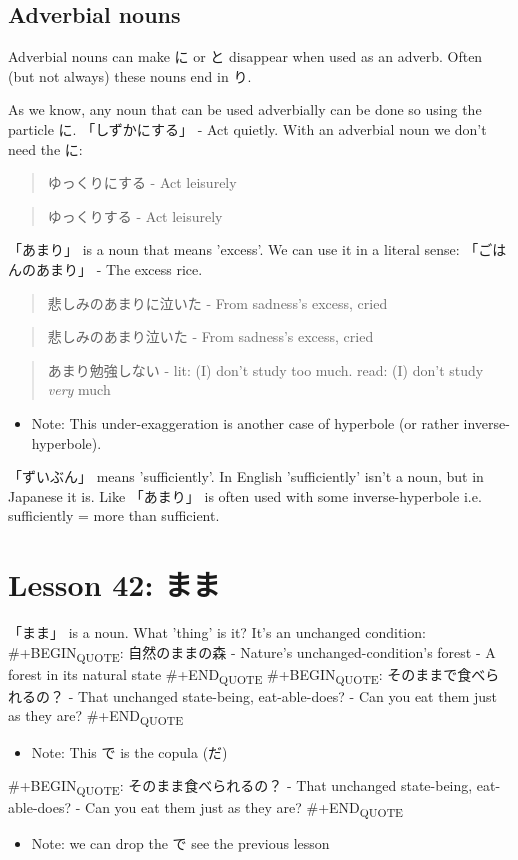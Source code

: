 \documentclass[11pt]{article}
\begin{document}
\subsection{Adverbial nouns}
\label{sec:org7eca3e8}
Adverbial nouns can make に or と disappear when used as an adverb. Often (but not always) these nouns end in り.

As we know, any noun that can be used adverbially can be done so using the particle に. 「しずかにする」 - Act quietly. With an adverbial noun we don't need the に:
\begin{quote}
ゆっくりにする - Act leisurely
\end{quote}
\begin{quote}
ゆっくりする - Act leisurely
\end{quote}

「あまり」 is a noun that means 'excess'. We can use it in a literal sense: 「ごはんのあまり」 - The excess rice.
\begin{quote}
悲しみのあまりに泣いた - From sadness's excess, cried
\end{quote}
\begin{quote}
悲しみのあまり泣いた - From sadness's excess, cried
\end{quote}
\begin{quote}
あまり勉強しない - lit: (I) don't study too much. read: (I) don't study \emph{very} much
\end{quote}
\begin{itemize}
\item Note: This under-exaggeration is another case of hyperbole (or rather inverse-hyperbole).
\end{itemize}

「ずいぶん」 means 'sufficiently'. In English 'sufficiently' isn't a noun, but in Japanese it is. Like 「あまり」 is often used with some inverse-hyperbole i.e. sufficiently = more than sufficient.
\section{Lesson 42: まま}
\label{sec:org25569b6}
「まま」 is a noun. What 'thing' is it? It's an unchanged condition:
\#+BEGIN\textsubscript{QUOTE}:
自然のままの森 - Nature's unchanged-condition's forest - A forest in its natural state
\#+END\textsubscript{QUOTE}
\#+BEGIN\textsubscript{QUOTE}:
そのままで食べられるの？ - That unchanged state-being, eat-able-does? - Can you eat them just as they are?
\#+END\textsubscript{QUOTE}
\begin{itemize}
\item Note: This で is the copula (だ)
\end{itemize}
\#+BEGIN\textsubscript{QUOTE}:
そのまま食べられるの？ - That unchanged state-being, eat-able-does? - Can you eat them just as they are?
\#+END\textsubscript{QUOTE}
\begin{itemize}
\item Note: we can drop the で see the previous lesson
\end{itemize}
\end{document}
